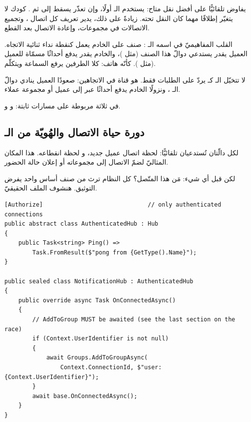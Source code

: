 \begin{idea}[الفكرة: \en{SignalR} = تجريد النقل + إدارة الاتصالات]
 يفاوض تلقائيًّا  على أفضل نقل متاح: يستخدم الـ
 أولًا، وإن تعذّر يسقط  إلى 
ثم . كودك لا يتغيّر إطلاقًا مهما كان النقل تحته. زيادةً على ذلك،
يدير  تعريف كل اتصال ، وتجميع الاتصالات في
مجموعات، وإعادة الاتصال بعد القطع.
\end{idea}

القلب المفاهيميّ في  اسمه الـ : صنف  على الخادم يعمل
كنقطة نداء ثنائية الاتجاه. العميل يقدر يستدعي دوالّ هذا الصنف (مثل
)، والخادم يقدر يدفع أحداثًا مسمّاة للعميل (مثل
). كأنّه هاتف: كلا الطرفين يرفع السماعة ويتكلّم.

\begin{keyp}
لا تتخيّل الـ  كـ  يردّ على الطلبات فقط. هو قناة في
الاتجاهين: صعودًا العميل ينادي دوالّ الـ ، ونزولًا
الخادم يدفع أحداثًا عبر  إلى عميل أو مجموعة عملاء.
\end{keyp}

في  ثلاثة  مربوطة على مسارات ثابتة: 
و و.

\subsection{دورة حياة الاتصال والهُويّة من الـ }

لكل  دالّتان تُستدعيان تلقائيًّا:  لحظة اتصال
عميل جديد، و لحظة انقطاعه. هذا المكان المثاليّ لضمّ
الاتصال إلى مجموعاته أو إعلان حالة الحضور.

لكن قبل أي شيء: مَن هذا المتّصل؟ كل  النظام ترث من صنف أساس واحد يفرض
التوثيق. هنشوف الملف الحقيقيّ.

\begin{english}
\begin{lstlisting}[language={[Sharp]C}]
[Authorize]                              // only authenticated connections
public abstract class AuthenticatedHub : Hub
{
    public Task<string> Ping() =>
        Task.FromResult($"pong from {GetType().Name}");
}

public sealed class NotificationHub : AuthenticatedHub
{
    public override async Task OnConnectedAsync()
    {
        // AddToGroup MUST be awaited (see the last section on the race)
        if (Context.UserIdentifier is not null)
        {
            await Groups.AddToGroupAsync(
                Context.ConnectionId, $"user:{Context.UserIdentifier}");
        }
        await base.OnConnectedAsync();
    }
}
\end{lstlisting}
\end{english}

